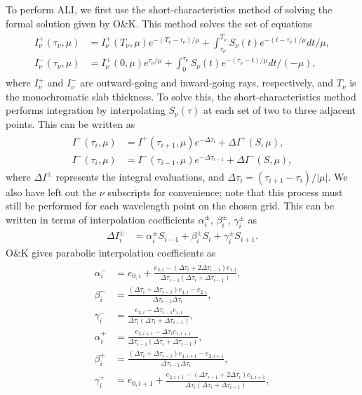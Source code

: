 \documentclass[12pt]{article}
\begin{document}
To perform ALI, we first use the short-characteristics method of solving the formal solution given by O\&K. This method solves the set of equations
\begin{align}
\begin{split}
I^+_\nu(\tau_\nu, \mu)
&=
I^+_\nu(T_\nu, \mu) e^{-(T_\nu - \tau_\nu) / \mu} + \int_{\tau_\nu}^{T_\nu} S_\nu(t) e^{-(t - \tau_\nu) / \mu} dt / \mu,
\\
I^-_\nu(\tau_\nu, \mu)
&=
I^+_\nu(0, \mu) e^{\tau_\nu / \mu} + \int_0^{\tau_\nu} S_\nu(t) e^{-(\tau_\nu - t) / \mu} dt / (-\mu),
\end{split}
\end{align}
where $I^+_\nu$ and $I^-_\nu$ are outward-going and inward-going rays, respectively, and $T_\nu$ is the monochromatic slab thickness. To solve this, the short-characteristics method performs integration by interpolating $S_\nu(\tau)$ at each set of two to three adjacent points. This can be written as
\begin{align}
\begin{split}
I^+(\tau_i, \mu)
&=
I^+(\tau_{i + 1}, \mu) e^{-\Delta\tau_i} + \Delta I^+(S, \mu),
\\
I^-(\tau_i, \mu)
&=
I^-(\tau_{i - 1}, \mu) e^{-\Delta\tau_{i - 1}} + \Delta I^-(S, \mu),
\label{eq:13}
\end{split}
\end{align}
where $\Delta I^\pm$ represents the integral evaluations, and $\Delta \tau_i = (\tau_{i + 1} - \tau_i) / |\mu|$. We also have left out the $\nu$ subscripts for convenience; note that this process must still be performed for each wavelength point on the chosen grid. This can be written in terms of interpolation coefficients $\alpha^\pm_i$, $\beta^\pm_i$, $\gamma^\pm_i$ as
\begin{align}
\Delta I^\pm_i
&=
\alpha^\pm_i S_{i - 1} + \beta^\pm_i S_i + \gamma^\pm_i S_{i + 1}.
\label{eq:16}
\end{align}
O\&K gives parabolic interpolation coefficients as
\begin{align}
\begin{split}
\alpha_i^-
&=
e_{0, i} +
\frac{e_{2, i} - (\Delta\tau_i + 2\Delta\tau_{i - 1}) e_{1, i}}
     {\Delta\tau_{i - 1} (\Delta\tau_i + \Delta\tau_{i - 1})},
\\
\beta_i^-
&=
\frac{(\Delta\tau_i + \Delta\tau_{i - 1}) e_{1, i} - e_{2, i}}
     {\Delta\tau_{i - 1} \Delta\tau_i},
\\
\gamma_i^-
&=
\frac{e_{2, i} - \Delta\tau_{i - 1} e_{1, i}}
     {\Delta\tau_i (\Delta\tau_i + \Delta\tau_{i - 1})},
\\
\alpha_i^+
&=
\frac{e_{2, i + 1} - \Delta\tau_i e_{1, i + 1}}
     {\Delta\tau_{i - 1} (\Delta\tau_i + \Delta\tau_{i - 1})},
\\
\beta_i^+
&=
\frac{(\Delta\tau_i + \Delta\tau_{i - 1}) e_{1, i + 1} - e_{2, i + 1}}
     {\Delta\tau_{i - 1} \Delta\tau_i},
\\
\gamma_i^+
&=
e_{0, i + 1} +
\frac{e_{2, i + 1} - (\Delta\tau_{i - 1} + 2\Delta\tau_i) e_{1, i + 1}}
     {\Delta\tau_i (\Delta\tau_i + \Delta\tau_{i - 1})},
\end{split}
\end{align}
\end{document}
